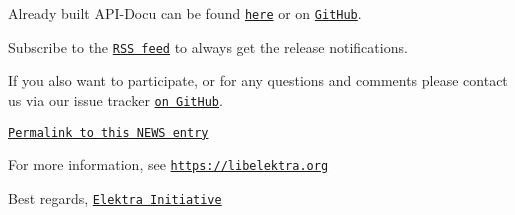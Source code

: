 Already built A\+P\+I-\/\+Docu can be found \href{https://doc.libelektra.org/api/0.9.2/html/}{\tt here} or on \href{https://github.com/ElektraInitiative/doc/tree/master/api/0.9.2}{\tt Git\+Hub}.

Subscribe to the \href{https://www.libelektra.org/news/feed.rss}{\tt R\+SS feed} to always get the release notifications.

If you also want to participate, or for any questions and comments please contact us via our issue tracker \href{http://issues.libelektra.org}{\tt on Git\+Hub}.

\href{https://www.libelektra.org/news/0.9.2-release}{\tt Permalink to this N\+E\+WS entry}

For more information, see \href{https://libelektra.org}{\tt https\+://libelektra.\+org}

Best regards, \href{https://www.libelektra.org/developers/authors}{\tt Elektra Initiative} 